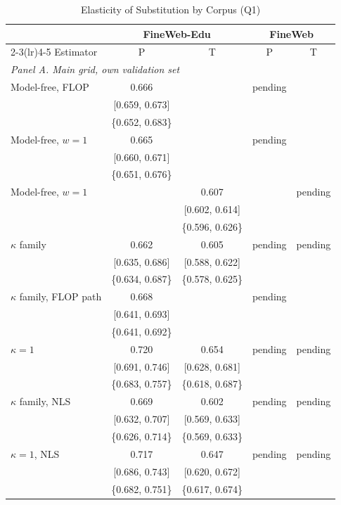 \begin{table}[tp]
\centering
\caption{Elasticity of Substitution by Corpus (Q1)}
\label{tab:m9-sigma}
\footnotesize
\setlength{\tabcolsep}{1pt}
\begin{tabular*}{\textwidth}{@{\extracolsep{\fill}}lcccc@{}}
\toprule
& \multicolumn{2}{c}{FineWeb-Edu} & \multicolumn{2}{c}{FineWeb} \\
\cmidrule(lr){2-3}\cmidrule(lr){4-5}
Estimator & P & T & P & T \\
\midrule
\multicolumn{5}{l}{\emph{Panel A. Main grid, own validation set}} \\
Model-free, FLOP & 0.666 &  & pending &  \\
 & [0.659, 0.673] &  &  &  \\
 & \{0.652, 0.683\} &  &  &  \\
Model-free, $w=1$ & 0.665 &  & pending &  \\
 & [0.660, 0.671] &  &  &  \\
 & \{0.651, 0.676\} &  &  &  \\
Model-free, $w=1$ &  & 0.607 &  & pending \\
 &  & [0.602, 0.614] &  &  \\
 &  & \{0.596, 0.626\} &  &  \\
$\kappa$ family & 0.662 & 0.605 & pending & pending \\
 & [0.635, 0.686] & [0.588, 0.622] &  &  \\
 & \{0.634, 0.687\} & \{0.578, 0.625\} &  &  \\
$\kappa$ family, FLOP path & 0.668 &  & pending &  \\
 & [0.641, 0.693] &  &  &  \\
 & \{0.641, 0.692\} &  &  &  \\
$\kappa=1$ & 0.720 & 0.654 & pending & pending \\
 & [0.691, 0.746] & [0.628, 0.681] &  &  \\
 & \{0.683, 0.757\} & \{0.618, 0.687\} &  &  \\
$\kappa$ family, NLS & 0.669 & 0.602 & pending & pending \\
 & [0.632, 0.707] & [0.569, 0.633] &  &  \\
 & \{0.626, 0.714\} & \{0.569, 0.633\} &  &  \\
$\kappa=1$, NLS & 0.717 & 0.647 & pending & pending \\
 & [0.686, 0.743] & [0.620, 0.672] &  &  \\
 & \{0.682, 0.751\} & \{0.617, 0.674\} &  &  \\

\end{tabular*}
\end{table}
